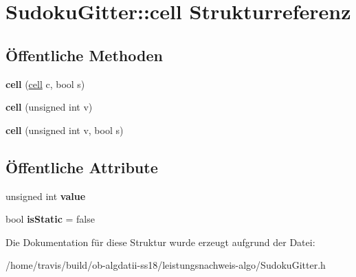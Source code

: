 \hypertarget{struct_sudoku_gitter_1_1cell}{\section{Sudoku\-Gitter\-:\-:cell Strukturreferenz}
\label{struct_sudoku_gitter_1_1cell}
}
\subsection*{Öffentliche Methoden}
\begin{DoxyCompactItemize}
\item 
\hypertarget{struct_sudoku_gitter_1_1cell_a867cb0594edf55a51cfce150af12bac4}{{\bfseries cell} (\hyperlink{struct_sudoku_gitter_1_1cell}{cell} c, bool s)}\label{struct_sudoku_gitter_1_1cell_a867cb0594edf55a51cfce150af12bac4}

\item 
\hypertarget{struct_sudoku_gitter_1_1cell_a92196ec7ee555a9f50ef03f57953a78e}{{\bfseries cell} (unsigned int v)}\label{struct_sudoku_gitter_1_1cell_a92196ec7ee555a9f50ef03f57953a78e}

\item 
\hypertarget{struct_sudoku_gitter_1_1cell_a4f2f5a023c6b9c7298ecbbc5e52dd3b9}{{\bfseries cell} (unsigned int v, bool s)}\label{struct_sudoku_gitter_1_1cell_a4f2f5a023c6b9c7298ecbbc5e52dd3b9}

\end{DoxyCompactItemize}
\subsection*{Öffentliche Attribute}
\begin{DoxyCompactItemize}
\item 
\hypertarget{struct_sudoku_gitter_1_1cell_ae94c3c4724471e981f766ee777fff2f0}{unsigned int {\bfseries value}}\label{struct_sudoku_gitter_1_1cell_ae94c3c4724471e981f766ee777fff2f0}

\item 
\hypertarget{struct_sudoku_gitter_1_1cell_a42aead8ed923732450dc150ef81ad9e8}{bool {\bfseries is\-Static} = false}\label{struct_sudoku_gitter_1_1cell_a42aead8ed923732450dc150ef81ad9e8}

\end{DoxyCompactItemize}


Die Dokumentation für diese Struktur wurde erzeugt aufgrund der Datei\-:\begin{DoxyCompactItemize}
\item 
/home/travis/build/ob-\/algdatii-\/ss18/leistungsnachweis-\/algo/Sudoku\-Gitter.\-h\end{DoxyCompactItemize}
